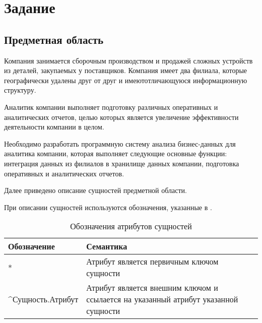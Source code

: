 




\tableofcontents		%
\thispagestyle{fancy}

\section{Задание}
\subsection{Предметная область}
Компания занимается сборочным  производством и  продажей сложных устройств из деталей, закупаемых у поставщиков. Компания имеет два филиала, которые географически удалены друг от друг и имеютотличающуюся информационную структуру.\par
Аналитик компании выполняет подготовку  различных  оперативных  и аналитических  отчетов, целью которых  является увеличение эффективности деятельности компании в целом.\par
Необходимо  разработать программную систему анализа бизнес-данных для аналитика компании, которая выполняет следующие основные функции: интеграция  данных  из  филиалов  в  хранилище данных  компании, подготовка оперативных и аналитических отчетов.\par
Далее приведено описание сущностей предметной области. \par
При описании сущностей используются обозначения, указанные в .
\begin{table}[h]
	\caption{\space Обозначения атрибутов сущностей}
	\label{semantic}
	\begin{tabular}{|p{5cm}|p{10cm}|}
		\hline
		\textbf{Обозначение} & \textbf{Семантика}\\
		\hline
		* & Атрибут является первичным ключом сущности\\
		\hline
		\textasciicircum Сущность.Атрибут & Атрибут является внешним ключом и ссылается на указанный атрибут указанной сущности\\
		\hline
	\end{tabular}
\end{table}

